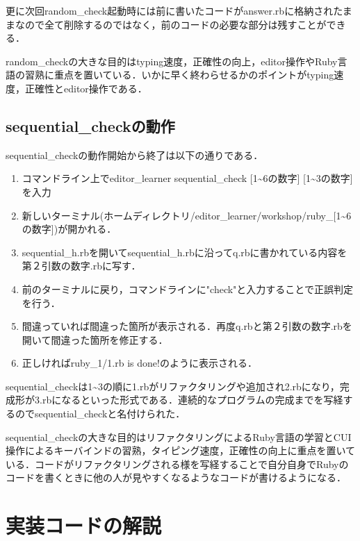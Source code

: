 \documentclass[11pt,dvipdfmx]{jsarticle}
\providecommand{\tightlist}{%
      \setlength{\itemsep}{0pt}\setlength{\parskip}{0pt}}
\begin{document}
更に次回random\_check起動時には前に書いたコードがanswer.rbに格納されたままなので全て削除するのではなく，前のコードの必要な部分は残すことができる．

random\_checkの大きな目的はtyping速度，正確性の向上，editor操作やRuby言語の習熟に重点を置いている．いかに早く終わらせるかのポイントがtyping速度，正確性とeditor操作である．

    \subsection{sequential\_checkの動作}\label{sequential_checkux306eux52d5ux4f5c}

    sequential\_checkの動作開始から終了は以下の通りである．

\begin{enumerate}
\def\labelenumi{\arabic{enumi}.}
\tightlist
\item
  コマンドライン上でeditor\_learner sequential\_check
  {[}1\textasciitilde{}6の数字{]} {[}1\textasciitilde{}3の数字{]}を入力
\item
  新しいターミナル(ホームディレクトリ/editor\_learner/workshop/ruby\_{[}1\textasciitilde{}6の数字{]})が開かれる．
\item
  sequential\_h.rbを開いてsequential\_h.rbに沿ってq.rbに書かれている内容を第２引数の数字.rbに写す．
\item
  前のターミナルに戻り，コマンドラインに"check"と入力することで正誤判定を行う．
\item
  間違っていれば間違った箇所が表示される．再度q.rbと第２引数の数字.rbを開いて間違った箇所を修正する．
\item
  正しければruby\_1/1.rb is done!のように表示される．
\end{enumerate}

sequential\_checkは1\textasciitilde{}3の順に1.rbがリファクタリングや追加され2.rbになり，完成形が3.rbになるといった形式である．連続的なプログラムの完成までを写経するのでsequential\_checkと名付けられた．

sequential\_checkの大きな目的はリファクタリングによるRuby言語の学習とCUI操作によるキーバインドの習熟，タイピング速度，正確性の向上に重点を置いている．コードがリファクタリングされる様を写経することで自分自身でRubyのコードを書くときに他の人が見やすくなるようなコードが書けるようになる．

    \section{実装コードの解説}\label{ux5b9fux88c5ux30b3ux30fcux30c9ux306eux89e3ux8aac}
\end{document}
